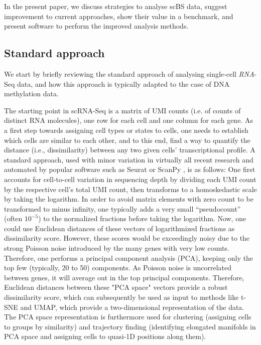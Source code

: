 \documentclass[twocolumn,10pt]{article}
\begin{document}
In the present paper, we discuss strategies to analyse scBS data, suggest improvement to current approaches, show their value in a benchmark, and present software to perform the improved analysis methods.

\subsection{Standard approach}

We start by briefly reviewing the standard approach of analysing single-cell \emph{RNA}-Seq data, and how this approach is typically adapted to the case of DNA methylation data.

The starting point in scRNA-Seq is a matrix of UMI counts (i.e. of counts of distinct RNA molecules), one row for each cell and one column for each gene. As a first step towards assigning cell types or states to cells, one needs to establish which cells are similar to each other, and to this end, find a way to quantify the distance (i.e., dissimilarity) between any two given cells' transcriptional profile. A standard approach, used with minor variation in virtually all recent research and automated by popular software such as Seurat \citep{Hao_2021} or ScanPy \citep{Wolf_2018}, is as follows: One first accounts for cell-to-cell variation in sequencing depth by dividing each UMI count by the respective cell's total UMI count, then transforms to a homoskedastic scale by taking the logarithm. In order to avoid matrix elements with zero count to be transformed to minus infinity, one typically adds a very small ``pseudocount'' (often $10^{-5}$) to the normalized fractions before taking the logarithm. Now, one could use Euclidean distances of these vectors  of logarithmized fractions as dissimilarity score. However, these scores would be exceedingly noisy due to the strong Poisson noise introduced by the many genes with very low counts. Therefore, one performs a principal component analysis (PCA), keeping only the top few (typically, 20 to 50) components. As Poisson noise is uncorrelated between genes, it will average out in the top principal components. Therefore, Euclidean distances between these "PCA space" vectors provide a robust dissimilarity score, which can subsequently be used as input to methods like t-SNE and UMAP, which provide a two-dimensional representation of the data. The PCA space representation is furthermore used for clustering (assigning cells to groups by similarity) and trajectory finding (identifying elongated manifolds in PCA space and assigning cells to quasi-1D positions along them).
\end{document}
